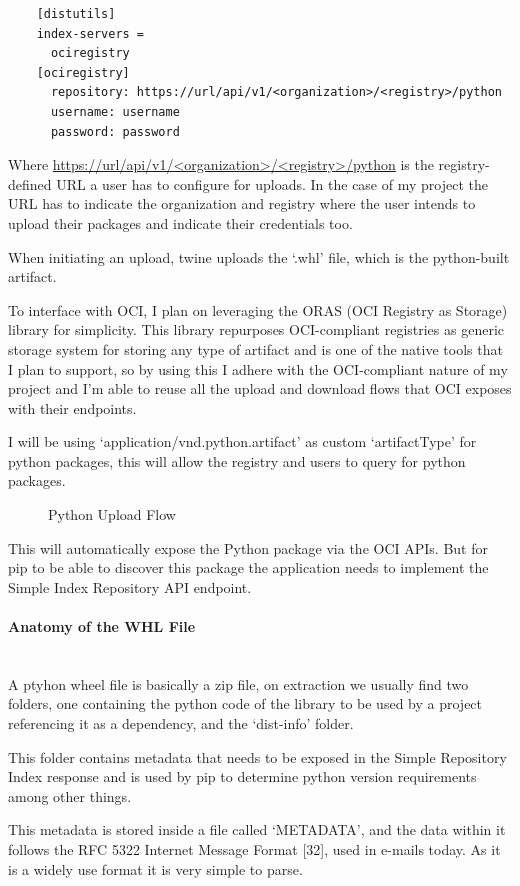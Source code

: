 \documentclass{article}
\newcommand{\widefig}[3][1.2\textwidth]{%
  \begin{figure}[H]
    \makebox[\textwidth][c]{%
      \texttt{[image: \#2]}%
    }
    \caption{#3}
  \end{figure}
}
\newcommand{\subsubsubsection}[1]{\paragraph{#1}\mbox{}\\}
\begin{document}
  \begin{lstlisting}
    [distutils]
    index-servers =
      ociregistry
    [ociregistry]
      repository: https://url/api/v1/<organization>/<registry>/python
      username: username
      password: password
  \end{lstlisting}

  Where \url{https://url/api/v1/<organization>/<registry>/python} is the registry-defined URL a user has to configure for uploads. In the case of my project the URL has to indicate the organization and registry where the user intends to upload their packages and indicate their credentials too.

  When initiating an upload, twine uploads the `.whl' file, which is the python-built artifact.

  To interface with OCI, I plan on leveraging the ORAS (OCI Registry as Storage) library for simplicity. This library repurposes OCI-compliant registries as generic storage system for storing any type of artifact and is one of the native tools that I plan to support, so by using this I adhere with the OCI-compliant nature of my project and I'm able to reuse all the upload and download flows that OCI exposes with their endpoints.

  I will be using `application/vnd.python.artifact' as custom `artifactType' for python packages, this will allow the registry and users to query for python packages.

  \widefig{appendix/python-upload-flow.png}{Python Upload Flow}

  This will automatically expose the Python package via the OCI APIs. But for pip to be able to discover this package the application needs to implement the Simple Index Repository API endpoint.

  \subsubsubsection{Anatomy of the WHL File}

  A ptyhon wheel file is basically a zip file, on extraction we usually find two folders, one containing the python code of the library to be used by a project referencing it as a dependency, and the `dist-info' folder.

  This folder contains metadata that needs to be exposed in the Simple Repository Index response and is used by pip to determine python version requirements among other things.

  This metadata is stored inside a file called `METADATA', and the data within it follows the RFC 5322 Internet Message Format [32], used in e-mails today. As it is a widely use format it is very simple to parse.
\end{document}
